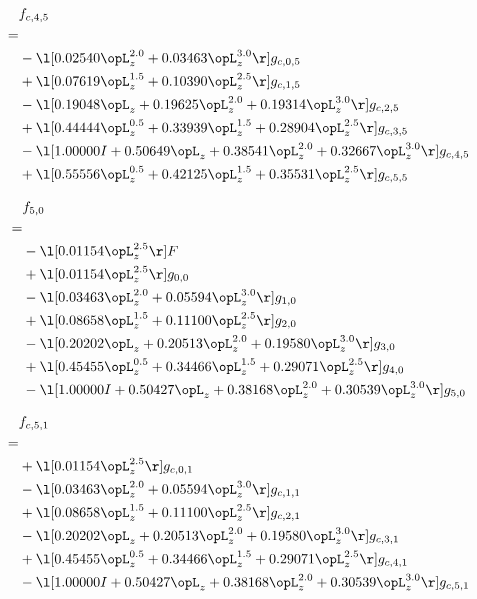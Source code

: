 \begin{alignat}{2} 
\label{eq:f_45_0} 
& f_{c,4,5} \nonumber \\ 
 = \\ 
& - \l[  0.02540 \opL_z^{2.0} +  0.03463 \opL_z^{3.0}  \r] g_{c,0,5} \nonumber \\ 
& + \l[  0.07619 \opL_z^{1.5} +  0.10390 \opL_z^{2.5}  \r] g_{c,1,5} \nonumber \\ 
& - \l[  0.19048 \opL_z +  0.19625 \opL_z^{2.0} +  0.19314 \opL_z^{3.0}  \r] g_{c,2,5} \nonumber \\ 
& + \l[  0.44444 \opL_z^{0.5} +  0.33939 \opL_z^{1.5} +  0.28904 \opL_z^{2.5}  \r] g_{c,3,5} \nonumber \\ 
& - \l[  1.00000 I +  0.50649 \opL_z +  0.38541 \opL_z^{2.0} +  0.32667 \opL_z^{3.0}  \r] g_{c,4,5} \nonumber \\ 
& + \l[  0.55556 \opL_z^{0.5} +  0.42125 \opL_z^{1.5} +  0.35531 \opL_z^{2.5}  \r] g_{c,5,5} \nonumber \\ 
\end{alignat} 


\begin{alignat}{2} 
\label{eq:f_50_0} 
& f_{5,0} \nonumber \\ 
 = \\ 
& - \l[  0.01154 \opL_z^{2.5}  \r] F \nonumber \\ 
& + \l[  0.01154 \opL_z^{2.5}  \r] g_{0,0} \nonumber \\ 
& - \l[  0.03463 \opL_z^{2.0} +  0.05594 \opL_z^{3.0}  \r] g_{1,0} \nonumber \\ 
& + \l[  0.08658 \opL_z^{1.5} +  0.11100 \opL_z^{2.5}  \r] g_{2,0} \nonumber \\ 
& - \l[  0.20202 \opL_z +  0.20513 \opL_z^{2.0} +  0.19580 \opL_z^{3.0}  \r] g_{3,0} \nonumber \\ 
& + \l[  0.45455 \opL_z^{0.5} +  0.34466 \opL_z^{1.5} +  0.29071 \opL_z^{2.5}  \r] g_{4,0} \nonumber \\ 
& - \l[  1.00000 I +  0.50427 \opL_z +  0.38168 \opL_z^{2.0} +  0.30539 \opL_z^{3.0}  \r] g_{5,0} \nonumber \\ 
\end{alignat} 


\begin{alignat}{2} 
\label{eq:f_51_0} 
& f_{c,5,1} \nonumber \\ 
 = \\ 
& + \l[  0.01154 \opL_z^{2.5}  \r] g_{c,0,1} \nonumber \\ 
& - \l[  0.03463 \opL_z^{2.0} +  0.05594 \opL_z^{3.0}  \r] g_{c,1,1} \nonumber \\ 
& + \l[  0.08658 \opL_z^{1.5} +  0.11100 \opL_z^{2.5}  \r] g_{c,2,1} \nonumber \\ 
& - \l[  0.20202 \opL_z +  0.20513 \opL_z^{2.0} +  0.19580 \opL_z^{3.0}  \r] g_{c,3,1} \nonumber \\ 
& + \l[  0.45455 \opL_z^{0.5} +  0.34466 \opL_z^{1.5} +  0.29071 \opL_z^{2.5}  \r] g_{c,4,1} \nonumber \\ 
& - \l[  1.00000 I +  0.50427 \opL_z +  0.38168 \opL_z^{2.0} +  0.30539 \opL_z^{3.0}  \r] g_{c,5,1} \nonumber \\ 
\end{alignat} 



